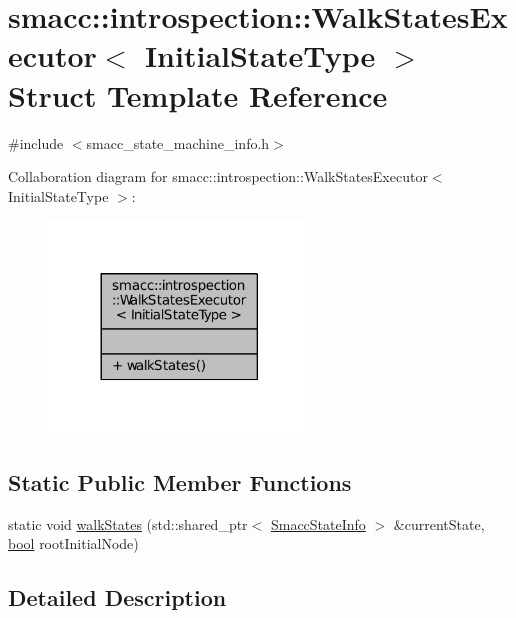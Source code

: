 \hypertarget{structsmacc_1_1introspection_1_1WalkStatesExecutor}{}\section{smacc\+:\+:introspection\+:\+:Walk\+States\+Executor$<$ Initial\+State\+Type $>$ Struct Template Reference}
\label{structsmacc_1_1introspection_1_1WalkStatesExecutor}


{\ttfamily \#include $<$smacc\+\_\+state\+\_\+machine\+\_\+info.\+h$>$}



Collaboration diagram for smacc\+:\+:introspection\+:\+:Walk\+States\+Executor$<$ Initial\+State\+Type $>$\+:
\nopagebreak
\begin{figure}[H]
\begin{center}
\leavevmode
\includegraphics[width=197pt]{structsmacc_1_1introspection_1_1WalkStatesExecutor__coll__graph}
\end{center}
\end{figure}
\subsection*{Static Public Member Functions}
\begin{DoxyCompactItemize}
\item 
static void \hyperlink{structsmacc_1_1introspection_1_1WalkStatesExecutor_a21848ccc6e7a7ddee0ccfff97e550ec6}{walk\+States} (std\+::shared\+\_\+ptr$<$ \hyperlink{classsmacc_1_1introspection_1_1SmaccStateInfo}{Smacc\+State\+Info} $>$ \&current\+State, \hyperlink{classbool}{bool} root\+Initial\+Node)
\end{DoxyCompactItemize}


\subsection{Detailed Description}
